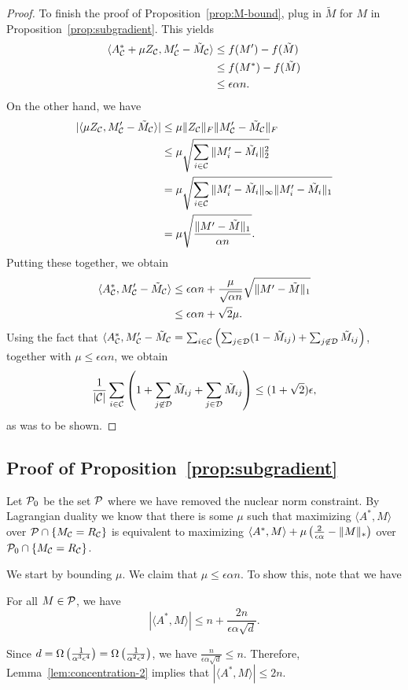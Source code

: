 \documentclass[11pt]{article}
\newcommand{\M}{\tilde{M}}
\newcommand{\Aa}{A^*}
\newcommand{\sD}{\mathcal{D}}
\begin{document}
\begin{proof}
To finish the proof of Proposition~\ref{prop:M-bound}, plug in $\M$ for $M$ in Proposition~\ref{prop:subgradient}. 
This yields
\begin{align}
\langle \Aa_{\sC} + \mu Z_{\sC}, M'_{\sC} - \M_{\sC} \rangle &\leq f(M') - f(\M) \\
 &\leq f(M^*) - f(\M) \\
 &\leq \epsilon \alpha n.
\end{align}
On the other hand, we have 
\begin{align}
|\langle \mu Z_{\sC}, M'_{\sC} - \M_{\sC} \rangle| &\leq \mu\|Z_{\sC}\|_F\|M'_{\sC} - \M_{\sC}\|_F \\
 &\leq \mu \sqrt{\sum_{i \in \sC} \|M'_i - \M_i\|_2^2} \\
 &= \mu \sqrt{\sum_{i \in \sC} \|M'_i - \M_i\|_{\infty}\|M'_i - \M_i\|_1} \\
 &= \mu \sqrt{\frac{\|M'-\M\|_1}{\alpha n}}.
\end{align}
Putting these together, we obtain
\begin{align}
\langle \Aa_{\sC}, M'_{\sC} - \M_{\sC} \rangle &\leq \epsilon \alpha n + \frac{\mu}{\sqrt{\alpha n}} \sqrt{\|M' - \M\|_1} \\
 &\leq \epsilon \alpha n + \sqrt{2}\mu.
\end{align}
Using the fact that $\langle \Aa_{\sC}, M'_{\sC} - \M_{\sC} = \sum_{i \in \sC}\p{\sum_{j \in \sD} (1 - \M_{ij}) + \sum_{j \not\in \sD} \M_{ij}}$, 
together with $\mu \leq \epsilon\alpha n$, we obtain 
\[ \frac{1}{|\sC|}\sum_{i \in \sC}\p{1 + \sum_{j\not\in \sD} \M_{ij} + \sum_{j \in \sD} \M_{ij}} \leq (1+\sqrt{2})\epsilon, \]
as was to be shown.
\end{proof}


\subsection{Proof of Proposition~\ref{prop:subgradient}}
Let $\mathcal{P}_0$ be the set $\mathcal{P}$ where we have removed the nuclear norm constraint. By Lagrangian duality we 
know that there is some $\mu$ such that maximizing $\langle \Aa, M \rangle$ over $\mathcal{P} \cap \{M_{\mathcal{C}} = R_{\mathcal{C}}\}$ 
is equivalent to maximizing $\langle \Aa, M \rangle + \mu\p{\frac{2}{\epsilon\alpha} - \|M\|_*}$ over 
$\mathcal{P}_0 \cap \{M_{\mathcal{C}} = R_{\mathcal{C}}\}$. 

We start by bounding $\mu$. We claim that $\mu \leq \epsilon \alpha n$. 
To show this, note that we have
\begin{lemma}
\label{lem:concentration-2}
For all $M \in \mathcal{P}$, we have
\[ |\langle \Aa, M\rangle| \leq n + \frac{2n}{\epsilon\alpha\sqrt{d}}. \]
\end{lemma}
Since $d = \Omega\left(\frac{1}{\alpha^3\epsilon^4}\right) = \Omega\left(\frac{1}{\alpha^2\epsilon^2}\right)$, 
we have $\frac{n}{\epsilon\alpha\sqrt{d}} \leq n$. Therefore, Lemma~\ref{lem:concentration-2} 
implies that $|\langle \Aa, M \rangle| \leq 2n$.
\end{document}
